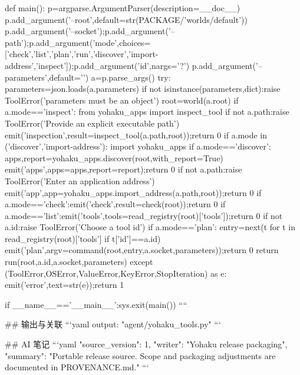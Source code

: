 def main():
    p=argparse.ArgumentParser(description=__doc__)
    p.add_argument('--root',default=str(PACKAGE/'worlds/default'))
    p.add_argument('--socket');p.add_argument('--path');p.add_argument('mode',choices=['check','list','plan','run','discover','import-address','inspect']);p.add_argument('id',nargs='?')
    p.add_argument('--parameters',default='{}')
    a=p.parse_args()
    try:
        parameters=json.loads(a.parameters)
        if not isinstance(parameters,dict):raise ToolError('parameters must be an object')
        root=world(a.root)
        if a.mode=='inspect':
            from yohaku_apps import inspect_tool
            if not a.path:raise ToolError('Provide an explicit executable path')
            emit('inspection',result=inspect_tool(a.path,root));return 0
        if a.mode in ('discover','import-address'):
            import yohaku_apps
            if a.mode=='discover':
                apps,report=yohaku_apps.discover(root,with_report=True)
                emit('apps',apps=apps,report=report);return 0
            if not a.path:raise ToolError('Enter an application address')
            emit('app',app=yohaku_apps.import_address(a.path,root));return 0
        if a.mode=='check':emit('check',result=check(root));return 0
        if a.mode=='list':emit('tools',tools=read_registry(root)['tools']);return 0
        if not a.id:raise ToolError('Choose a tool id')
        if a.mode=='plan':
            entry=next(t for t in read_registry(root)['tools'] if t['id']==a.id)
            emit('plan',argv=command(root,entry,a.socket,parameters));return 0
        return run(root,a.id,a.socket,parameters)
    except (ToolError,OSError,ValueError,KeyError,StopIteration) as e:
        emit('error',text=str(e));return 1

if __name__=='__main__':sys.exit(main())
````

## 输出与关联
```yaml
output: "agent/yohaku_tools.py"
```

## AI 笔记
```yaml
{"source_version": 1, "writer": "Yohaku release packaging", "summary": "Portable release source. Scope and packaging adjustments are documented in PROVENANCE.md."}
```
